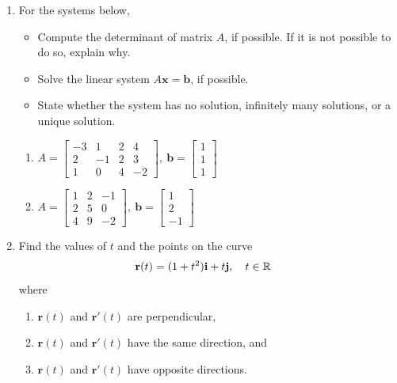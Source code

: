\documentclass{article}
\begin{document}
\begin{enumerate}
\item
For the systems below,
\begin{itemize}
\item Compute the determinant of matrix $A$, if possible. If it is not possible to do so, explain why. 
\item Solve the linear system $A\mathbf{x} = \mathbf{b}$, if possible. 
\item State whether the system has no solution, infinitely many solutions, or a unique solution.
\end{itemize}

\begin{enumerate}
\item \(
 A = \begin{bmatrix}
  -3 &  1 & 2 &  4 \\
   2 & -1 & 2 &  3 \\
   1 &  0 & 4 & -2
 \end{bmatrix}, \ 
 \mathbf{b} = \begin{bmatrix} 1 \\ 1 \\ 1 \end{bmatrix}
\)
\item \( A = \begin{bmatrix}
 1 & 2 & -1 \\
 2 & 5 & 0 \\
 4 & 9 & -2
\end{bmatrix} , \ 
 \mathbf{b} =
\begin{bmatrix} 1 \\ 2 \\ -1 \end{bmatrix} \)
\end{enumerate}

\item 
Find the values of $t$ and the points on the curve 
\begin{align*}
  \mathbf{r}(t) &= (1+t^2) \mathbf{i} + t\mathbf{j}, \quad t\in \mathbb{R}
\end{align*}
where
\begin{enumerate}
  \item $\mathbf{r}(t)$ and $\mathbf{r}'(t)$ are perpendicular,
  \item $\mathbf{r}(t)$ and $\mathbf{r}'(t)$ have the same direction, and
  \item $\mathbf{r}(t)$ and $\mathbf{r}'(t)$ have opposite directions.   
\end{enumerate}


\end{enumerate}
\end{document}
